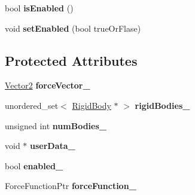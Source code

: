 \begin{DoxyCompactItemize}
\item 
\hypertarget{class_rigid2_d_1_1_force_af6fe2f52330219e2b4452c1b0ade8f26}{
bool {\bfseries isEnabled} ()}
\label{class_rigid2_d_1_1_force_af6fe2f52330219e2b4452c1b0ade8f26}

\item 
\hypertarget{class_rigid2_d_1_1_force_a254ad6142afa1db8ac5253329d957493}{
void {\bfseries setEnabled} (bool trueOrFlase)}
\label{class_rigid2_d_1_1_force_a254ad6142afa1db8ac5253329d957493}

\end{DoxyCompactItemize}
\subsection*{Protected Attributes}
\begin{DoxyCompactItemize}
\item 
\hypertarget{class_rigid2_d_1_1_force_a8731e7993558de6d18b50ed1842cc328}{
\hyperlink{class_rigid2_d_1_1_vector2}{Vector2} {\bfseries forceVector\_\-}}
\label{class_rigid2_d_1_1_force_a8731e7993558de6d18b50ed1842cc328}

\item 
\hypertarget{class_rigid2_d_1_1_force_a68256e29012e62d8c5abe32df8f5fded}{
unordered\_\-set$<$ \hyperlink{class_rigid2_d_1_1_rigid_body}{RigidBody} $\ast$ $>$ {\bfseries rigidBodies\_\-}}
\label{class_rigid2_d_1_1_force_a68256e29012e62d8c5abe32df8f5fded}

\item 
\hypertarget{class_rigid2_d_1_1_force_a1c74bfc6b4dc0c2e767f6937134a1aaf}{
unsigned int {\bfseries numBodies\_\-}}
\label{class_rigid2_d_1_1_force_a1c74bfc6b4dc0c2e767f6937134a1aaf}

\item 
\hypertarget{class_rigid2_d_1_1_force_aef76b4d68c7c8e8254191a45de833365}{
void $\ast$ {\bfseries userData\_\-}}
\label{class_rigid2_d_1_1_force_aef76b4d68c7c8e8254191a45de833365}

\item 
\hypertarget{class_rigid2_d_1_1_force_a4fcf795662e3dc2c990ed21455c758f6}{
bool {\bfseries enabled\_\-}}
\label{class_rigid2_d_1_1_force_a4fcf795662e3dc2c990ed21455c758f6}

\item 
\hypertarget{class_rigid2_d_1_1_force_af5f9f8395225f86681d8870717406f78}{
ForceFunctionPtr {\bfseries forceFunction\_\-}}
\label{class_rigid2_d_1_1_force_af5f9f8395225f86681d8870717406f78}

\end{DoxyCompactItemize}


